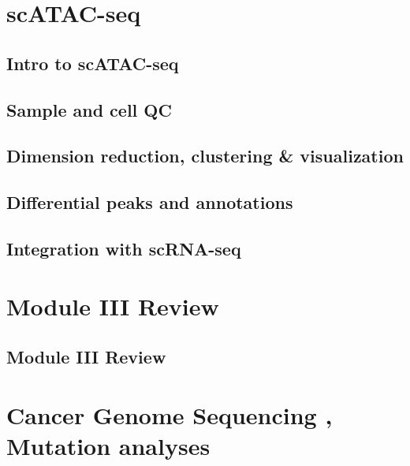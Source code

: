 \documentclass[
]{book}
\begin{document}
\hypertarget{scatac}{%
\chapter{scATAC-seq}\label{scatac}}

\hypertarget{intro-to-scatac-seq}{%
\section{Intro to scATAC-seq}\label{intro-to-scatac-seq}}

\hypertarget{sample-and-cell-qc}{%
\section{Sample and cell QC}\label{sample-and-cell-qc}}

\hypertarget{dimension-reduction-clustering-visualization}{%
\section{Dimension reduction, clustering \& visualization}\label{dimension-reduction-clustering-visualization}}

\hypertarget{differential-peaks-and-annotations}{%
\section{Differential peaks and annotations}\label{differential-peaks-and-annotations}}

\hypertarget{integration-with-scrna-seq}{%
\section{Integration with scRNA-seq}\label{integration-with-scrna-seq}}

\hypertarget{m3re}{%
\chapter{Module III Review}\label{m3re}}

\hypertarget{module-iii-review}{%
\section{Module III Review}\label{module-iii-review}}

\hypertarget{cancerseq}{%
\chapter{Cancer Genome Sequencing , Mutation analyses}\label{cancerseq}}
\end{document}

